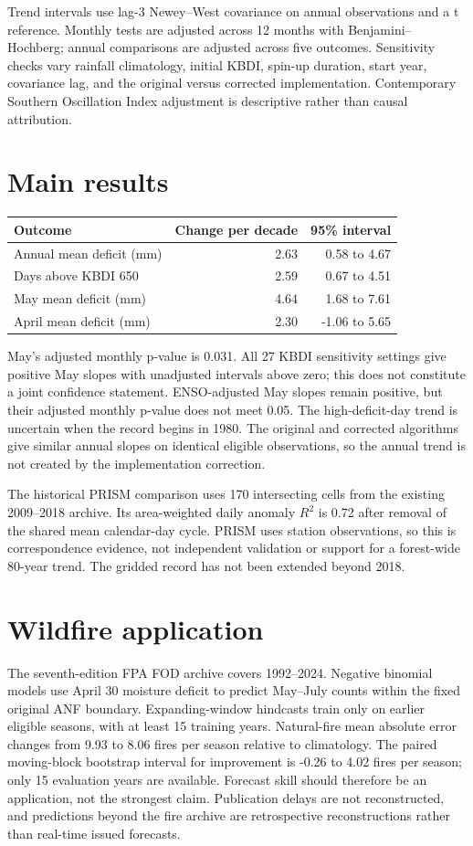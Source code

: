 \documentclass[11pt]{article}
\begin{document}
Trend intervals use lag-3 Newey--West covariance on annual observations and a t reference. Monthly tests are adjusted across 12 months with Benjamini--Hochberg; annual comparisons are adjusted across five outcomes. Sensitivity checks vary rainfall climatology, initial KBDI, spin-up duration, start year, covariance lag, and the original versus corrected implementation. Contemporary Southern Oscillation Index adjustment is descriptive rather than causal attribution.

\section{Main results}
\begin{center}
\begin{tabular}{lrr}
\toprule
Outcome & Change per decade & 95\% interval \\
\midrule
Annual mean deficit (mm) & 2.63 & 0.58 to 4.67 \\
Days above KBDI 650 & 2.59 & 0.67 to 4.51 \\
May mean deficit (mm) & 4.64 & 1.68 to 7.61 \\
April mean deficit (mm) & 2.30 & -1.06 to 5.65 \\
\bottomrule
\end{tabular}
\end{center}
May's adjusted monthly p-value is 0.031. All 27 KBDI sensitivity settings give positive May slopes with unadjusted intervals above zero; this does not constitute a joint confidence statement. ENSO-adjusted May slopes remain positive, but their adjusted monthly p-value does not meet 0.05. The high-deficit-day trend is uncertain when the record begins in 1980. The original and corrected algorithms give similar annual slopes on identical eligible observations, so the annual trend is not created by the implementation correction.

The historical PRISM comparison uses 170 intersecting cells from the existing 2009--2018 archive. Its area-weighted daily anomaly $R^2$ is 0.72 after removal of the shared mean calendar-day cycle. PRISM uses station observations, so this is correspondence evidence, not independent validation or support for a forest-wide 80-year trend. The gridded record has not been extended beyond 2018.

\section{Wildfire application}
The seventh-edition FPA FOD archive covers 1992--2024. Negative binomial models use April 30 moisture deficit to predict May--July counts within the fixed original ANF boundary. Expanding-window hindcasts train only on earlier eligible seasons, with at least 15 training years. Natural-fire mean absolute error changes from 9.93 to 8.06 fires per season relative to climatology. The paired moving-block bootstrap interval for improvement is -0.26 to 4.02 fires per season; only 15 evaluation years are available. Forecast skill should therefore be an application, not the strongest claim. Publication delays are not reconstructed, and predictions beyond the fire archive are retrospective reconstructions rather than real-time issued forecasts.
\end{document}
